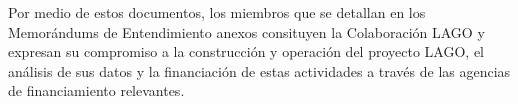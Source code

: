 \documentclass[12pt,a4paper]{article}
\newif\ifes
\newif\ifen
\newif\ifpt
\begin{document}
Por medio de estos documentos, los miembros que se detallan en los Memorándums
de Entendimiento anexos consituyen la Colaboración LAGO y expresan su
compromiso a la construcción y operación del proyecto LAGO, el análisis de sus
datos y la financiación de estas actividades a través de las agencias de
financiamiento relevantes.


\fi

\estrue
\enfalse
\ptfalse
\def \country{\countryes}
\setcounter{secnumdepth}{10}


\newpage
{}
\esfalse
\entrue
\ptfalse
\def \country{\countryen}
\setcounter{section}{0}


% 
\end{document}
